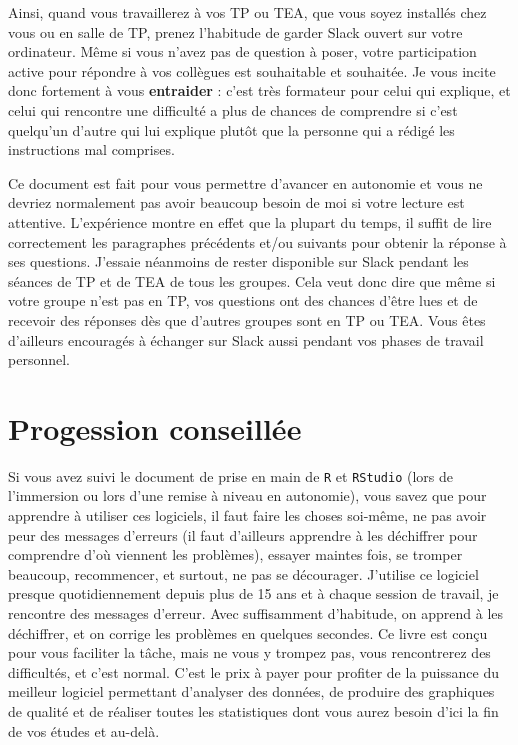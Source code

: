 \documentclass[
  a4paper,
  DIV=11,
  numbers=noendperiod,
  oneside]{scrreprt}
\begin{document}
Ainsi, quand vous travaillerez à vos TP ou TEA, que vous soyez installés
chez vous ou en salle de TP, prenez l'habitude de garder Slack ouvert
sur votre ordinateur. Même si vous n'avez pas de question à poser, votre
participation active pour répondre à vos collègues est souhaitable et
souhaitée. Je vous incite donc fortement à vous \textbf{entraider} :
c'est très formateur pour celui qui explique, et celui qui rencontre une
difficulté a plus de chances de comprendre si c'est quelqu'un d'autre
qui lui explique plutôt que la personne qui a rédigé les instructions
mal comprises.

Ce document est fait pour vous permettre d'avancer en autonomie et vous
ne devriez normalement pas avoir beaucoup besoin de moi si votre lecture
est attentive. L'expérience montre en effet que la plupart du temps, il
suffit de lire correctement les paragraphes précédents et/ou suivants
pour obtenir la réponse à ses questions. J'essaie néanmoins de rester
disponible sur Slack pendant les séances de TP et de TEA de tous les
groupes. Cela veut donc dire que même si votre groupe n'est pas en TP,
vos questions ont des chances d'être lues et de recevoir des réponses
dès que d'autres groupes sont en TP ou TEA. Vous êtes d'ailleurs
encouragés à échanger sur Slack aussi pendant vos phases de travail
personnel.

\hypertarget{progession-conseilluxe9e}{%
\section*{Progession conseillée}\label{progession-conseilluxe9e}}


Si vous avez suivi le document de prise en main de \texttt{R} et
\texttt{RStudio} (lors de l'immersion ou lors d'une remise à niveau en
autonomie), vous savez que pour apprendre à utiliser ces logiciels, il
faut faire les choses soi-même, ne pas avoir peur des messages d'erreurs
(il faut d'ailleurs apprendre à les déchiffrer pour comprendre d'où
viennent les problèmes), essayer maintes fois, se tromper beaucoup,
recommencer, et surtout, ne pas se décourager. J'utilise ce logiciel
presque quotidiennement depuis plus de 15 ans et à chaque session de
travail, je rencontre des messages d'erreur. Avec suffisamment
d'habitude, on apprend à les déchiffrer, et on corrige les problèmes en
quelques secondes. Ce livre est conçu pour vous faciliter la tâche, mais
ne vous y trompez pas, vous rencontrerez des difficultés, et c'est
normal. C'est le prix à payer pour profiter de la puissance du meilleur
logiciel permettant d'analyser des données, de produire des graphiques
de qualité et de réaliser toutes les statistiques dont vous aurez besoin
d'ici la fin de vos études et au-delà.
\end{document}
